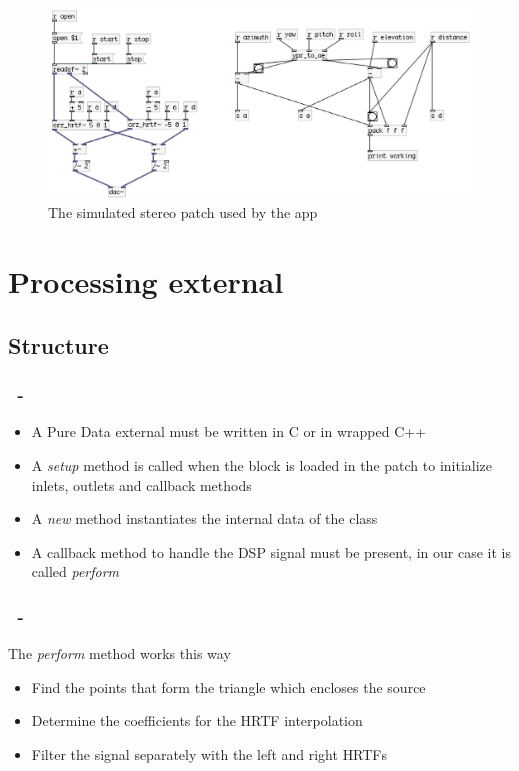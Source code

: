 \documentclass{beamer}
\begin{document}
	\begin{frame}
		\frametitle{\insertsection}
		\begin{figure}
			\centering
			  \includegraphics[width=1.0\textwidth]{images/iOS_patch_stereo.png}
			  \caption{The simulated stereo patch used by the app}
		\end{figure}
	\end{frame}

	\section{Processing external}
	\subsection{Structure}

	\begin{frame}
		\frametitle{\insertsection\ - \insertsubsection}
		\begin{itemize}
			\item A Pure Data external must be written in C or in wrapped C++
			\item A {\em setup} method is called when the block is loaded in the patch to initialize inlets,
				outlets and callback methods
			\item A {\em new} method instantiates the internal data of the class
			\item A callback method to handle the DSP signal must be present, in our case it is called {\em perform}
		\end{itemize}
	\end{frame}

	\begin{frame}
		\frametitle{\insertsection\ - \insertsubsection}
		The {\em perform} method works this way
		\begin{itemize}
			\item Find the points that form the triangle which encloses the source
			\item Determine the coefficients for the \textsc{HRTF} interpolation
			\item Filter the signal separately with the left and right \textsc{HRTF}s
		\end{itemize}
	\end{frame}
\end{document}
